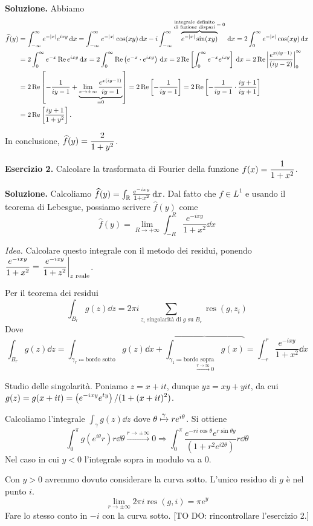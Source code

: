 \textbf{Soluzione.}
Abbiamo
\begin{align*}
	\widehat{f}(y) & = \int_{-\infty}^\infty e^{-|x|} e^{ixy} \,\mathrm{d} x 
	= \int_{-\infty}^\infty e^{-|x|} \cos(xy) \,\mathrm{d} x 
	- i \int_{-\infty}^\infty \overbrace{e^{-|x|} \sin(xy)}^{\substack{\text{integrale definito} \\ \text{di fuzione dispari}} \; = \; 0 } \,\mathrm{d} x
	= 2 \int_{0}^{\infty} e^{-|x|} \cos(xy) \,\mathrm{d} x \\
	& = 2 \int_0^\infty e^{-x} \operatorname{Re} e^{ixy} \,\mathrm{d} x
	= 2 \int_0^\infty \operatorname{Re} \left( e^{-x} \cdot e^{ixy} \right) \,\mathrm{d} x
	= 2 \operatorname{Re} \left[ \int_0^\infty e^{-x} e^{ixy} \right] \,\mathrm{d} x
	= 2 \operatorname{Re} \left| \frac{e^{x(iy - 1)}}{(iy - 2)} \right|_0^\infty \\
	& = 2 \operatorname{Re} \left[ -\frac{1}{iy - 1} + \underbrace{\lim_{x \to \pm \infty} \frac{e^{x(iy -1)}}{iy - 1}}_{= 0}\right]
	= 2 \operatorname{Re} \left[ -\frac{1}{iy - 1} \right]
	= 2\operatorname{Re} \left[ -\frac{1}{iy-1} \cdot \frac{iy + 1}{iy + 1} \right] \\
	& = 2\operatorname{Re} \left[ \frac{iy + 1}{1 + y^2} \right].
\end{align*}

In conclusione, $\displaystyle \widehat{f}(y) = \frac{2}{1 + y^2}$.

\vss

\textbf{Esercizio 2.} Calcolare la trasformata di Fourier della funzione $\displaystyle f(x) = \frac{1}{1 + x^2}$.

\textbf{Soluzione.}
Calcoliamo $\widehat{f}(y) = \int_\mathbb R \frac{e^{-ixy}}{1 + x^2} \,\mathrm{d} x$.
Dal fatto che $f \in L^1$ e usando il teorema di Lebesgue, possiamo scrivere $\hat{f}(y)$ come
%
$$
	\hat{f}(y) = \lim_{R \to +\infty} \int_{-R}^R \frac{e^{-ixy}}{1 + x^2} \dd x
$$
%

\textit{Idea.} Calcolare questo integrale con il metodo dei residui, ponendo $\displaystyle \frac{e^{-ixy}}{1 + x^2} = \left. \frac{e^{-izy}}{1 + z^2} \right|_{z \text{ reale}}$.

Per il teorema dei residui
%
$$
	\int_{B_r} g(z) \dd z = 2\pi i \sum_{z_i \text{ singolarità di } g \text{ su } B_r} \operatorname{res} (g,z_i) 
$$
%
Dove
%
$$
	\int_{B_r} g(z) \dd z = \int_{\gamma_r \coloneqq \text{bordo sotto}} g(z) \dd x 
	+ \overbrace{\int_{\gamma_1 \coloneqq \text{bordo sopra}} g(x)}_{\xrightarrow{r \to \infty} 0}
	= \int_{-r}^{r} \frac{e^{-ixy}}{1 + x^2} \dd x 
$$
%

Studio delle singolarità. Poniamo $z = x + it$, dunque $yz = xy + yit$, da cui $\displaystyle g(z) = g(x + it) = \left( e^{-ixy} e^{ty} \right) / (1 + (x + it)^2)$.

Calcoliamo l'integrale $\int_\gamma g(z) \dd z$ dove $\theta \xmapsto{\gamma} r e^{i\theta}$.
Si ottiene
%
$$
	\int_0^\pi g(e^{i\theta}r) r \dd \theta \xrightarrow{r \to \pm \infty} 0
	\Longrightarrow \int_0^\pi \frac{e^{-ri\cos \theta} e^{r \sin\theta y}}{(1 + r^2 e^{i2\theta})} r \dd \theta
$$
%
Nel caso in cui $y < 0$ l'integrale sopra in modulo va a 0.

Con $y > 0$ avremmo dovuto considerare la curva sotto.
L'unico residuo di $g$ è nel punto $i$.
%
$$
	\lim_{r \to \pm \infty} 2\pi i \operatorname{res}(g,i) = \pi e^{y}
$$
%
Fare lo stesso conto in $-i$ con la curva sotto. [TO DO: rincontrollare l'esercizio 2.]




